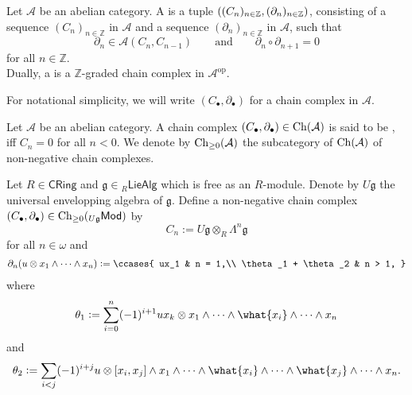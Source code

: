 \begin{definition}
	Let $\mathcal{A}$ be an abelian category. A  is a tuple $\del[0]{(C_n)_{n \in \mathbb{Z}},(\partial_n)_{n \in \mathbb{Z}}}$, consisting of a sequence $(C_n)_{n \in \mathbb{Z}}$ in $\mathcal{A}$ and a sequence $(\partial_n)_{n \in \mathbb{Z}}$ in $\mathcal{A}$, such that 
	\begin{equation*}
		\partial_n \in \mathcal{A}(C_n,C_{n - 1}) \qquad \text{and} \qquad \partial_n \circ \partial_{n + 1} = 0
	\end{equation*}
	\noindent for all $n \in \mathbb{Z}$.\\
	Dually, a  is a $\mathbb{Z}$-graded chain complex in $\mathcal{A}^\mathrm{op}$. 
\end{definition}

\begin{remark}
	For notational simplicity, we will write $(C_\bullet,\partial_\bullet)$ for a chain complex in $\mathcal{A}$.
\end{remark}

\begin{definition}
	Let $\mathcal{A}$ be an abelian category. A chain complex $(C_\bullet,\partial_\bullet) \in \operatorname{Ch}(\mathcal{A})$ is said to be , iff $C_n = 0$ for all $n < 0$. We denote by $\operatorname{Ch}_{\geq 0}(\mathcal{A})$ the subcategory of $\operatorname{Ch}(\mathcal{A})$ of non-negative chain complexes.
\end{definition}

\begin{definition}
	\label{def:CEc}
	Let $R \in \mathsf{CRing}$ and $\mathfrak{g} \in {_{R}}\mathsf{LieAlg}$ which is free as an $R$-module. Denote by $U\mathfrak{g}$ the universal envelopping algebra of $\mathfrak{g}$. Define a non-negative chain complex $(C_\bullet,\partial_\bullet) \in \operatorname{Ch}_{\geq 0}({_{U\mathfrak{g}}}\mathsf{Mod})$ by
	\begin{equation*}
		C_n := U\mathfrak{g} \otimes_R\Lambda^n \mathfrak{g}
	\end{equation*}
	\noindent for all $n \in \omega$ and
	\begin{align*}
		\partial_n(u \otimes x_1 \wedge \dots \wedge x_n) := \ccases{
			ux_1 & n = 1,\\
			\theta_1 + \theta_2 & n > 1,
		}
	\end{align*}
	\noindent where
	\begin{equation*}
		\theta_1 := \sum_{i = 0}^n (-1)^{i + 1} ux_k \otimes x_1 \wedge \dots \wedge \what{x_i} \wedge \dots \wedge x_n
	\end{equation*}
	\noindent and
	\begin{equation*}
		\theta_2 := \sum_{i < j} (-1)^{i + j} u \otimes [x_i,x_j] \wedge x_1 \wedge \dots \wedge \what{x_i} \wedge \dots \wedge \what{x_j} \wedge \dots \wedge x_n.
	\end{equation*}
\end{definition}


